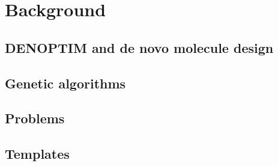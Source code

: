 \chapter*{Background}
\section*{DENOPTIM and de novo molecule design}
\section*{Genetic algorithms}
\section*{Problems}
\section*{Templates}
